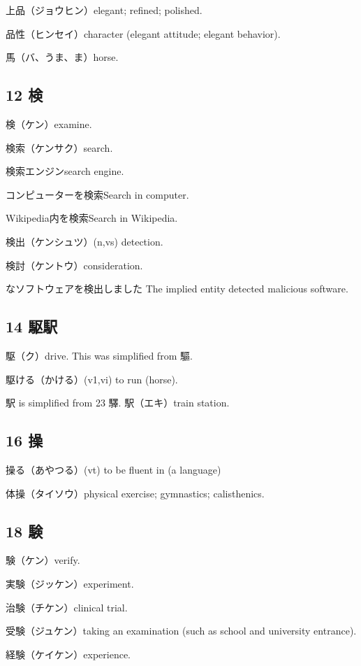 上品（ジョウヒン）elegant; refined; polished.

品性（ヒンセイ）character (elegant attitude; elegant behavior).

馬（バ、うま、ま）horse.

\subsection{12 検}

検（ケン）examine.

検索（ケンサク）search.

検索エンジンsearch engine.

コンピューターを検索Search in computer.

Wikipedia内を検索Search in Wikipedia.

検出（ケンシュツ）(n,vs) detection.

検討（ケントウ）consideration.

なソフトウェアを検出しました
The implied entity detected malicious software.

\subsection{14 駆駅}

駆（ク）drive.
This was simplified from 驅.

駆ける（かける）(v1,vi) to run (horse).

駅 is simplified from 23 驛.
駅（エキ）train station.

\subsection{16 操}

操る（あやつる）(vt) to be fluent in (a language)

体操（タイソウ）physical exercise; gymnastics; calisthenics.

\subsection{18 験}

験（ケン）verify.

実験（ジッケン）experiment.

治験（チケン）clinical trial.

受験（ジュケン）taking an examination (such as school and university entrance).

経験（ケイケン）experience.

